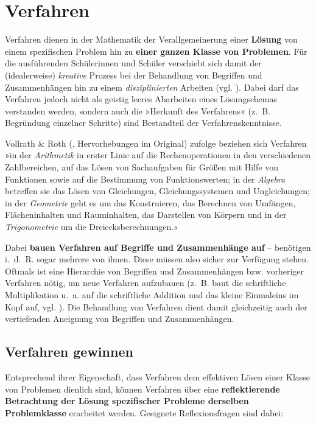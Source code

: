\documentclass[
]{scrbook}
\theoremstyle{definition}
\theoremstyle{definition}
\theoremstyle{definition}
\theoremstyle{definition}
\theoremstyle{remark}
\begin{document}
\section{Verfahren}\label{verfahren}

Verfahren dienen in der Mathematik der Verallgemeinerung einer \textbf{Lösung} von einem spezifischen Problem hin zu \textbf{einer ganzen Klasse von Problemen}. Für die ausführenden Schülerinnen und Schüler verschiebt sich damit der (idealerweise) \emph{kreative} Prozess bei der Behandlung von Begriffen und Zusammenhängen hin zu einem \emph{disziplinierten} Arbeiten (vgl. ). Dabei darf das Verfahren jedoch nicht als geistig leeres Abarbeiten eines Lösungschemas verstanden werden, sondern auch die »Herkunft des Verfahrens« (z.~B. Begründung einzelner Schritte) sind Bestandteil der Verfahrenskenntnisse.

Vollrath \& Roth (, Hervorhebungen im Original) zufolge beziehen sich Verfahren »in der \emph{Arithmetik} in erster Linie auf die Rechenoperationen in den verschiedenen Zahlbereichen, auf das Lösen von Sachaufgaben für Größen mit Hilfe von Funktionen sowie auf die Bestimmung von Funktionswerten; in der \emph{Algebra} betreffen sie das Lösen von Gleichungen, Gleichungssystemen und Ungleichungen; in der \emph{Geometrie} geht es um das Konstruieren, das Berechnen von Umfängen, Flächeninhalten und Rauminhalten, das Darstellen von Körpern und in der \emph{Trigonometrie} um die Dreiecksberechnungen.«

Dabei \textbf{bauen Verfahren auf Begriffe und Zusammenhänge auf} -- benötigen i.~d.~R. sogar mehrere von ihnen. Diese müssen also sicher zur Verfügung stehen. Oftmals ist eine Hierarchie von Begriffen und Zusammenhängen bzw. vorheriger Verfahren nötig, um neue Verfahren aufzubauen (z.~B. baut die schriftliche Multiplikation u.~a. auf die schriftliche Addition und das kleine Einmaleins im Kopf auf, vgl. ). Die Behandlung von Verfahren dient damit gleichzeitig auch der vertiefenden Aneignung von Begriffen und Zusammenhängen.

\subsection{Verfahren gewinnen}\label{verfahren-gewinnen}

Entsprechend ihrer Eigenschaft, dass Verfahren dem effektiven Lösen einer Klasse von Problemen dienlich sind, können Verfahren über eine \textbf{reflektierende Betrachtung der Lösung spezifischer Probleme derselben Problemklasse} erarbeitet werden. Geeignete Reflexionsfragen sind dabei:
\end{document}
